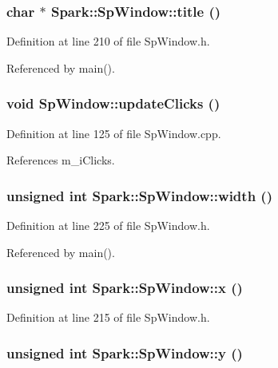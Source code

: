 \subsubsection{\setlength{\rightskip}{0pt plus 5cm}char $\ast$ Spark::Sp\-Window::title ()\hspace{0.3cm}{\tt  [inline]}}\label{classSpark_1_1SpWindow_a24}


Definition at line 210 of file Sp\-Window.h.

Referenced by main().
\subsubsection{\setlength{\rightskip}{0pt plus 5cm}void Sp\-Window::update\-Clicks ()}\label{classSpark_1_1SpWindow_a22}


Definition at line 125 of file Sp\-Window.cpp.

References m\_\-i\-Clicks.
\subsubsection{\setlength{\rightskip}{0pt plus 5cm}unsigned int Spark::Sp\-Window::width ()\hspace{0.3cm}{\tt  [inline]}}\label{classSpark_1_1SpWindow_a27}


Definition at line 225 of file Sp\-Window.h.

Referenced by main().
\subsubsection{\setlength{\rightskip}{0pt plus 5cm}unsigned int Spark::Sp\-Window::x ()\hspace{0.3cm}{\tt  [inline]}}\label{classSpark_1_1SpWindow_a25}


Definition at line 215 of file Sp\-Window.h.
\subsubsection{\setlength{\rightskip}{0pt plus 5cm}unsigned int Spark::Sp\-Window::y ()\hspace{0.3cm}{\tt  [inline]}}\label{classSpark_1_1SpWindow_a26}


